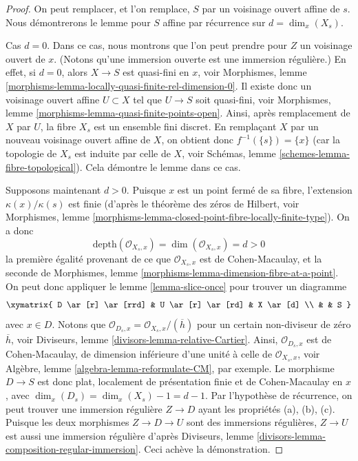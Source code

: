 \begin{proof}
On peut remplacer, et l'on remplace, $S$ par un voisinage ouvert affine de $s$.
Nous démontrerons le lemme pour $S$ affine par récurrence sur $d = \dim_x(X_s)$.

\medskip\noindent
Cas $d = 0$. Dans ce cas, nous montrons que l'on peut prendre pour $Z$
un voisinage ouvert de $x$. (Notons qu'une immersion ouverte est
une immersion régulière.) En effet, si $d = 0$, alors $X \to S$
est quasi-fini en $x$, voir
Morphismes, lemme \ref{morphisms-lemma-locally-quasi-finite-rel-dimension-0}.
Il existe donc un voisinage ouvert affine $U \subset X$ tel
que $U \to S$ soit quasi-fini, voir
Morphismes, lemme \ref{morphisms-lemma-quasi-finite-points-open}.
Ainsi, après remplacement de $X$ par $U$, la fibre $X_s$ est un ensemble
fini discret. En remplaçant $X$ par un nouveau voisinage ouvert affine
de $X$, on obtient donc $f^{-1}(\{s\}) = \{x\}$ (car la topologie
de $X_s$ est induite par celle de $X$, voir
Schémas, lemme \ref{schemes-lemma-fibre-topological}).
Cela démontre le lemme dans ce cas.

\medskip\noindent
Supposons maintenant $d > 0$. Puisque $x$ est un point fermé de sa
fibre, l'extension $\kappa(x)/\kappa(s)$ est finie (d'après le
théorème des zéros de Hilbert, voir
Morphismes, lemme \ref{morphisms-lemma-closed-point-fibre-locally-finite-type}).
On a donc
$$
\text{depth}(\mathcal{O}_{X_s, x}) = \dim(\mathcal{O}_{X_s, x}) = d > 0
$$
la première égalité provenant de ce que $\mathcal{O}_{X_s, x}$ est de Cohen-Macaulay,
et la seconde de
Morphismes, lemme \ref{morphisms-lemma-dimension-fibre-at-a-point}.
On peut donc appliquer le
lemme \ref{lemma-slice-once}
pour trouver un diagramme
$$
\xymatrix{
D \ar[r] \ar[rrd] & U \ar[r] \ar[rd] & X \ar[d] \\
& & S
}
$$
avec $x \in D$. Notons que
$\mathcal{O}_{D_s, x} = \mathcal{O}_{X_s, x}/(\overline{h})$ pour un certain
non-diviseur de zéro $\overline{h}$, voir
Diviseurs, lemme \ref{divisors-lemma-relative-Cartier}.
Ainsi, $\mathcal{O}_{D_s, x}$ est de Cohen-Macaulay, de dimension
inférieure d'une unité à celle de $\mathcal{O}_{X_s, x}$, voir
Algèbre, lemme \ref{algebra-lemma-reformulate-CM},
par exemple. Le morphisme $D \to S$ est donc plat,
localement de présentation finie et de Cohen-Macaulay en $x$, avec
$\dim_x(D_s) = \dim_x(X_s) - 1 = d - 1$. Par l'hypothèse de récurrence,
on peut trouver une immersion régulière $Z \to D$ ayant les propriétés (a), (b), (c).
Puisque les deux morphismes $Z \to D \to U$ sont des immersions régulières,
$Z \to U$ est aussi une immersion régulière d'après
Diviseurs, lemme \ref{divisors-lemma-composition-regular-immersion}.
Ceci achève la démonstration.
\end{proof}

